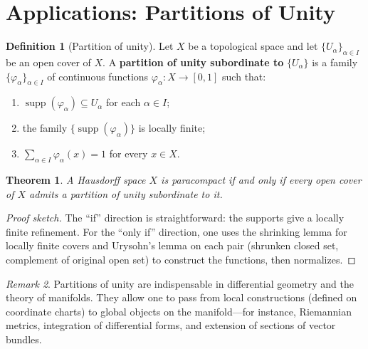 \documentclass[11pt,a4paper,twoside]{book}
\newtheorem{theorem}{Theorem}[section]
\theoremstyle{remark}
\newtheorem{remark}[theorem]{Remark}
\theoremstyle{definition}
\theoremstyle{definition}
\newtheorem{definition}{Definition}[section]
\begin{document}
\section{Applications: Partitions of Unity}
\label{sec:partitions-of-unity}

\begin{definition}[Partition of unity]
\label{def:partition-of-unity}
Let $X$ be a topological space and let $\{U_\alpha\}_{\alpha\in I}$ be
an open cover of $X$.  A \textbf{partition of unity subordinate to}
$\{U_\alpha\}$ is a family $\{\varphi_\alpha\}_{\alpha\in I}$ of
continuous functions $\varphi_\alpha\colon X\to[0,1]$ such that:
\begin{enumerate}
  \item $\operatorname{supp}(\varphi_\alpha)\subseteq U_\alpha$ for each
        $\alpha\in I$;
  \item the family $\{\operatorname{supp}(\varphi_\alpha)\}$ is
        locally finite;
  \item $\sum_{\alpha\in I}\varphi_\alpha(x) = 1$ for every $x\in X$.
\end{enumerate}
\end{definition}

\begin{theorem}
\label{thm:partition-of-unity-paracompact}
A Hausdorff space $X$ is paracompact if and only if every open cover
of $X$ admits a partition of unity subordinate to it.
\end{theorem}

\begin{proof}[Proof sketch]
The ``if'' direction is straightforward: the supports give a locally
finite refinement.  For the ``only if'' direction, one uses the
shrinking lemma for locally finite covers and Urysohn's lemma on each
pair (shrunken closed set, complement of original open set) to
construct the functions, then normalizes.
\end{proof}

\begin{remark}
\label{rem:partitions-applications}
Partitions of unity are indispensable in differential geometry and the
theory of manifolds.  They allow one to pass from local constructions
(defined on coordinate charts) to global objects on the manifold---for
instance, Riemannian metrics, integration of differential forms, and
extension of sections of vector bundles.
\end{remark}
\end{document}
